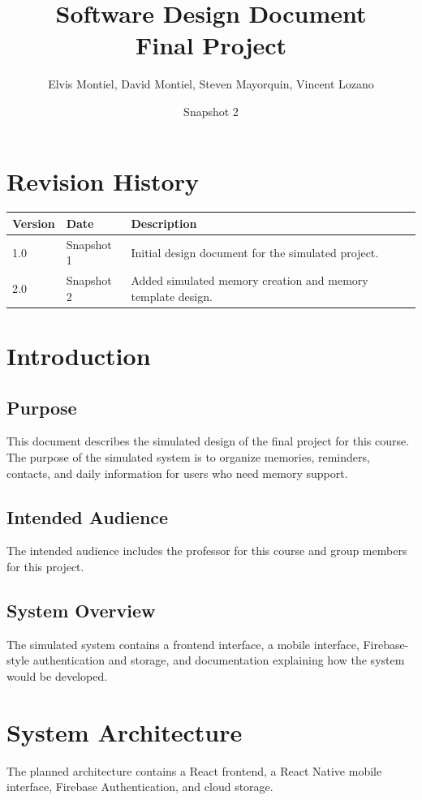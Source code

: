 \documentclass{article}
\title{Software Design Document\\Final Project}
\author{Elvis Montiel, David Montiel, Steven Mayorquin, Vincent Lozano}
\date{Snapshot 2}
\begin{document}
\maketitle
\tableofcontents
\newpage

\section{Revision History}
\begin{longtable}{|p{2cm}|p{3cm}|p{8cm}|}
\hline
Version & Date & Description \\ \hline
1.0 & Snapshot 1 & Initial design document for the simulated project. \\ \hline
2.0 & Snapshot 2 & Added simulated memory creation and memory template design. \\ \hline
\end{longtable}

\section{Introduction}
\subsection{Purpose}
This document describes the simulated design of the final project for this course. The purpose of the simulated system is to organize memories, reminders, contacts, and daily information for users who need memory support.

\subsection{Intended Audience}
The intended audience includes the professor for this course and group members for this project.

\subsection{System Overview}
The simulated system contains a frontend interface, a mobile interface, Firebase-style authentication and storage, and documentation explaining how the system would be developed.

\section{System Architecture}
The planned architecture contains a React frontend, a React Native mobile interface, Firebase Authentication, and cloud storage.
\end{document}
